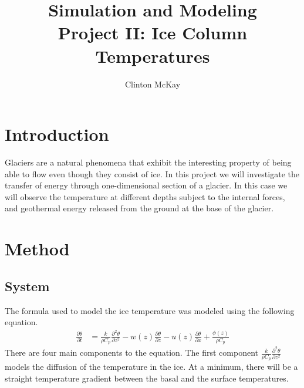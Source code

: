 \documentclass{article}%
\begin{document}
    \title{Simulation and Modeling\\Project II: Ice Column Temperatures}
    \author{Clinton McKay}
    \maketitle

    \twocolumn

    \section{Introduction}
    Glaciers are a natural phenomena that exhibit the interesting property of being able to flow even
    though they consist of ice. 
    In this project we will investigate the transfer of energy through 
    one-dimensional section of a glacier. 
    In this case we will observe the temperature at different depths 
    subject to the internal forces, and geothermal energy released from the ground at the base of the 
    glacier. 

    \section{Method}
    \subsection{System}
    The formula used to model the ice temperature was modeled using the following equation.
    \begin{align*}
           \frac{\partial \theta}{\partial t} &= \frac{k}{\rho C_p} \frac{\partial^2 \theta}{\partial z^2}
                                              -w(z) \frac{\partial \theta}{\partial z}
                                              -u(z) \frac{\partial \theta}{\partial x}
                                              +\frac{\phi(z)}{\rho C_p}
    \end{align*} 
    There are four main components to the equation. 
    The first component $\frac{k}{\rho C_p} \frac{\partial^2 \theta}{\partial z^2}$ models the diffusion of the temperature in the ice. 
    At a minimum, there will be a straight temperature gradient between the basal and the surface temperatures.
\end{document}
